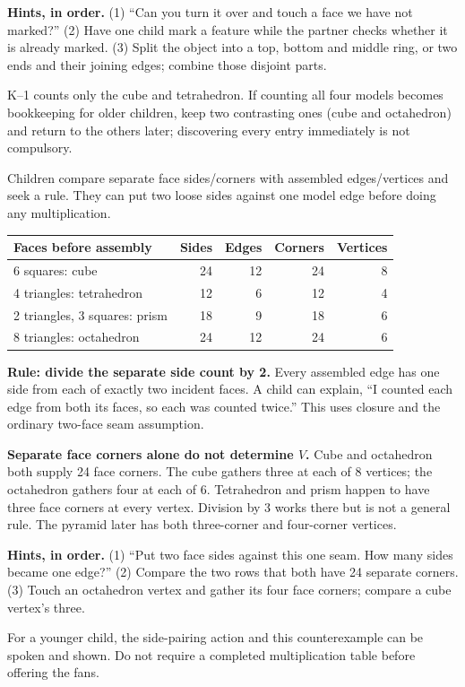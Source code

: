\documentclass[11pt,letterpaper]{article}
\newcommand{\sub}[1]{\par\vspace{3pt}{\bfseries #1}\par}
\newcommand{\hints}[3]{\textbf{Hints, in order.} (1) #1 (2) #2 (3) #3\par}
\begin{document}
\hints{``Can you turn it over and touch a face we have not marked?''}{Have one child mark a feature while the partner checks whether it is already marked.}{Split the object into a top, bottom and middle ring, or two ends and their joining edges; combine those disjoint parts.}
K--1 counts only the cube and tetrahedron. If counting all four models becomes bookkeeping for older children, keep two contrasting ones (cube and octahedron) and return to the others later; discovering every entry immediately is not compulsory.

\sub{Problem 2 / student p.2 / concrete core}
Children compare separate face sides/corners with assembled edges/vertices and seek a rule. They can put two loose sides against one model edge before doing any multiplication.

\begin{center}
\begin{tabular}{|l|r|r|r|r|}\hline
Faces before assembly & Sides & Edges & Corners & Vertices\\\hline
6 squares: cube & 24 & 12 & 24 & 8\\
4 triangles: tetrahedron & 12 & 6 & 12 & 4\\
2 triangles, 3 squares: prism & 18 & 9 & 18 & 6\\
8 triangles: octahedron & 24 & 12 & 24 & 6\\\hline
\end{tabular}
\end{center}
\textbf{Rule: divide the separate side count by 2.} Every assembled edge has one side from each of exactly two incident faces. A child can explain, ``I counted each edge from both its faces, so each was counted twice.'' This uses closure and the ordinary two-face seam assumption.

\textbf{Separate face corners alone do not determine $V$.} Cube and octahedron both supply 24 face corners. The cube gathers three at each of 8 vertices; the octahedron gathers four at each of 6. Tetrahedron and prism happen to have three face corners at every vertex. Division by 3 works there but is not a general rule. The pyramid later has both three-corner and four-corner vertices.

\hints{``Put two face sides against this one seam. How many sides became one edge?''}{Compare the two rows that both have 24 separate corners.}{Touch an octahedron vertex and gather its four face corners; compare a cube vertex's three.}
For a younger child, the side-pairing action and this counterexample can be spoken and shown. Do not require a completed multiplication table before offering the fans.
\end{document}
